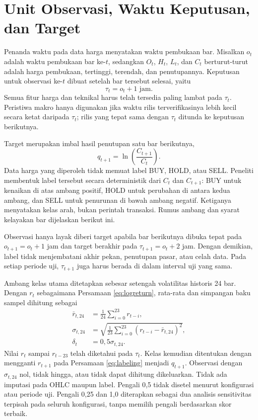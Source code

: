 \section{Unit Observasi, Waktu Keputusan, dan Target}

Penanda waktu pada data harga menyatakan waktu pembukaan bar. Misalkan $o_t$ adalah waktu pembukaan bar ke-$t$, sedangkan $O_t$, $H_t$, $L_t$, dan $C_t$ berturut-turut adalah harga pembukaan, tertinggi, terendah, dan penutupannya. Keputusan untuk observasi ke-$t$ dibuat setelah bar tersebut selesai, yaitu
\begin{equation}
\tau_t=o_t+1\text{ jam}.
\label{eq:waktu-keputusan}
\end{equation}
Semua fitur harga dan teknikal harus telah tersedia paling lambat pada $\tau_t$. Peristiwa makro hanya digunakan jika waktu rilis terverifikasinya lebih kecil secara ketat daripada $\tau_t$; rilis yang tepat sama dengan $\tau_t$ ditunda ke keputusan berikutnya.

Target merupakan imbal hasil penutupan satu bar berikutnya,
\begin{equation}
q_{t+1}=\ln\left(\frac{C_{t+1}}{C_t}\right).
\label{eq:target-satu-jam}
\end{equation}
Data harga yang diperoleh tidak memuat label BUY, HOLD, atau SELL. Peneliti membentuk label tersebut secara deterministik dari $C_t$ dan $C_{t+1}$: BUY untuk kenaikan di atas ambang positif, HOLD untuk perubahan di antara kedua ambang, dan SELL untuk penurunan di bawah ambang negatif. Ketiganya menyatakan kelas arah, bukan perintah transaksi. Rumus ambang dan syarat kelayakan bar dijelaskan berikut ini.

Observasi hanya layak diberi target apabila bar berikutnya dibuka tepat pada $o_{t+1}=o_t+1$ jam dan target berakhir pada $\tau_{t+1}=o_t+2$ jam. Dengan demikian, label tidak menjembatani akhir pekan, penutupan pasar, atau celah data. Pada setiap periode uji, $\tau_{t+1}$ juga harus berada di dalam interval uji yang sama.

Ambang kelas utama ditetapkan sebesar setengah volatilitas historis 24 bar. Dengan $r_t$ sebagaimana Persamaan \ref{eq:logreturn}, rata-rata dan simpangan baku sampel dihitung sebagai
\begin{align}
\bar r_{t,24} &= \frac{1}{24}\sum_{i=0}^{23}r_{t-i},\\
\sigma_{t,24} &= \sqrt{\frac{1}{23}\sum_{i=0}^{23}\left(r_{t-i}-\bar r_{t,24}\right)^2},\\
\delta_t &= 0{,}5\sigma_{t,24}.
\label{eq:ambang-volatilitas}
\end{align}
Nilai $r_t$ sampai $r_{t-23}$ telah diketahui pada $\tau_t$. Kelas kemudian ditentukan dengan mengganti $r_{t+1}$ pada Persamaan \ref{eq:labeling} menjadi $q_{t+1}$. Observasi dengan $\sigma_{t,24}$ nol, tidak hingga, atau tidak dapat dihitung dikeluarkan. Tidak ada imputasi pada OHLC maupun label. Pengali 0,5 tidak disetel menurut konfigurasi atau periode uji. Pengali 0,25 dan 1,0 diterapkan sebagai dua analisis sensitivitas terpisah pada seluruh konfigurasi, tanpa memilih pengali berdasarkan skor terbaik.

